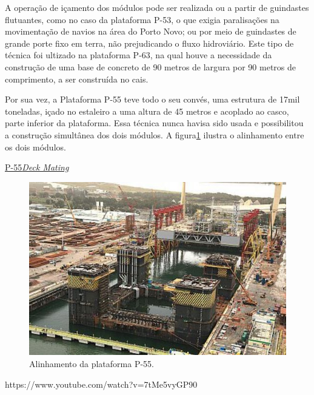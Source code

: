 A operação de içamento dos módulos pode ser realizada ou a partir de guindastes
flutuantes, como no caso da plataforma P-53, o que exigia paralisações 
na movimentação de navios na área do Porto Novo; ou por meio de guindastes de
grande porte fixo em terra, não prejudicando o fluxo hidroviário. Este tipo de
técnica foi ultizado na plataforma P-63, na qual houve a necessidade da
construção de uma base de concreto de 90 metros de largura por 90 metros de
comprimento, a ser construída no cais.

Por sua vez, a Plataforma P-55 teve todo o seu convés, uma estrutura de 17mil
toneladas, içado no estaleiro a uma altura de 45 metros e acoplado ao casco,
parte inferior da plataforma. Essa técnica nunca havisa sido usada e
possibilitou a construção simultânea dos dois módulos. A figura\ref{P55} ilustra
o alinhamento entre os dois módulos.

\href{http://www.offshoreenergytoday.com/brazils-petrobras-completes-deck-mating-on-p-55-platform/}{P-55\textit{Deck
Mating}}

\begin{figure}[h!]
    \centering
    \includegraphics[width=0.9\columnwidth]{figs/mating/P55}
    \caption{Alinhamento da plataforma P-55.}
    \label{P55}
\end{figure} 


https://www.youtube.com/watch?v=7tMe5vyGP90